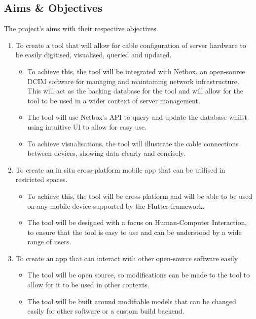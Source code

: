 \documentclass [11pt,a4paper]{article}
\begin{document}
\subsection{Aims \& Objectives}
\label{sec:objectives}
The project's aims with their respective objectives.
\begin{enumerate}[noitemsep, labelindent=0pt, label=\textbf{A\arabic*}]
    
    \item To create a tool that will allow for cable configuration of server hardware to be
    easily digitised, visualised, queried and updated. 
        
    \begin{itemize}[noitemsep, topsep=0pt]
    \item To achieve this, the tool will be integrated with Netbox, an open-source DCIM software for managing and maintaining network infrastructure. This will act as the backing database for the tool and will allow for the tool to be used in a wider context of server management.

    \item The tool will use Netbox's API to query and update the database whilst using intuitive UI to allow for easy use.
        
    \item To achieve visualisations, the tool will illustrate the cable connections between devices, showing data clearly and concisely.
    \end{itemize}
    \item To create an in situ cross-platform mobile app that can be utilised in restricted
    spaces.    
    \begin{itemize}[noitemsep, topsep=0pt]
        \item To achieve this, the tool will be cross-platform and will be able to be used on any mobile device supported by the Flutter framework.
        \item The tool will be designed with a focus on Human-Computer Interaction, to ensure that the tool is easy to use and can be understood by a wide range of users.
    \end{itemize} 

    \item To create an app that can interact with other open-source software easily
    \begin{itemize}[noitemsep, topsep=0pt]
        \item The tool will be open source, so modifications can be made to the tool to allow for it to be used in other contexts.
        \item The tool will be built around modifiable models that can be changed easily for other software or a custom build backend.        
    \end{itemize}
        

\end{enumerate}
\end{document}
